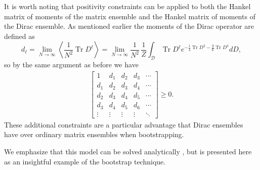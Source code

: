 \documentclass[10pt]{article}
\DeclareMathOperator{\tr}{Tr}
\begin{document}
It is worth noting that positivity constraints can be applied to both the Hankel matrix of moments of the matrix ensemble and the Hankel matrix of moments of the Dirac ensemble. As mentioned earlier the moments of the Dirac operator are defined as 
\begin{equation*}
	d_{\ell} = 	\lim_{N \rightarrow \infty}\left\langle \frac{1}{N^2}\tr D^{\ell}\right\rangle=\lim_{N \rightarrow \infty} \frac{1}{N^2}\, \frac{1}{Z}\int_{\mathcal{D}}\tr D^{\ell} e^{-\frac{1}{4}\tr D^2 - \frac{g}{6} \tr D^3 } dD,
\end{equation*}
so by the same argument as before we have
\begin{align*}
	\begin{bmatrix}
		1   &  d_1 &  d_2 & d_3 & \cdots \\ 
		d_1 &  d_2 &  d_3 & d_4 & \cdots \\
		d_2 &  d_3 &  d_4 & d_5 & \cdots \\
		d_3 &  d_4 &  d_5 & d_6 & \cdots \\
		\vdots & \vdots &  \vdots & \vdots & \ddots
	\end{bmatrix} \geq 0.
\end{align*}
These additional constraints are a particular advantage that Dirac ensembles have over ordinary matrix ensembles when bootstrapping.

We emphasize that this model can be solved analytically \cite{HKP 2}, but is presented here as an insightful example of the bootstrap technique. 
\end{document}
